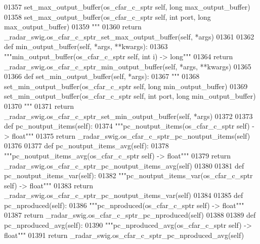 \begin{DoxyCode}
{{{{{{01357 \textcolor{stringliteral}{        set\_max\_output\_buffer(os\_cfar\_c\_sptr self, long max\_output\_buffer)}
01358 \textcolor{stringliteral}{        set\_max\_output\_buffer(os\_cfar\_c\_sptr self, int port, long max\_output\_buffer)}
01359 \textcolor{stringliteral}{        """}
01360         \textcolor{keywordflow}{return} \_radar\_swig.os\_cfar\_c\_sptr\_set\_max\_output\_buffer(self, *args)
01361 
01362     \textcolor{keyword}{def }min_output_buffer(self, *args, **kwargs):
01363         \textcolor{stringliteral}{"""min\_output\_buffer(os\_cfar\_c\_sptr self, int i) -> long"""}
01364         \textcolor{keywordflow}{return} \_radar\_swig.os\_cfar\_c\_sptr\_min\_output\_buffer(self, *args, **kwargs)
01365 
01366     \textcolor{keyword}{def }set_min_output_buffer(self, *args):
01367         \textcolor{stringliteral}{"""}
01368 \textcolor{stringliteral}{        set\_min\_output\_buffer(os\_cfar\_c\_sptr self, long min\_output\_buffer)}
01369 \textcolor{stringliteral}{        set\_min\_output\_buffer(os\_cfar\_c\_sptr self, int port, long min\_output\_buffer)}
01370 \textcolor{stringliteral}{        """}
01371         \textcolor{keywordflow}{return} \_radar\_swig.os\_cfar\_c\_sptr\_set\_min\_output\_buffer(self, *args)
01372 
01373     \textcolor{keyword}{def }pc_noutput_items(self):
01374         \textcolor{stringliteral}{"""pc\_noutput\_items(os\_cfar\_c\_sptr self) -> float"""}
01375         \textcolor{keywordflow}{return} \_radar\_swig.os\_cfar\_c\_sptr\_pc\_noutput\_items(self)
01376 
01377     \textcolor{keyword}{def }pc_noutput_items_avg(self):
01378         \textcolor{stringliteral}{"""pc\_noutput\_items\_avg(os\_cfar\_c\_sptr self) -> float"""}
01379         \textcolor{keywordflow}{return} \_radar\_swig.os\_cfar\_c\_sptr\_pc\_noutput\_items\_avg(self)
01380 
01381     \textcolor{keyword}{def }pc_noutput_items_var(self):
01382         \textcolor{stringliteral}{"""pc\_noutput\_items\_var(os\_cfar\_c\_sptr self) -> float"""}
01383         \textcolor{keywordflow}{return} \_radar\_swig.os\_cfar\_c\_sptr\_pc\_noutput\_items\_var(self)
01384 
01385     \textcolor{keyword}{def }pc_nproduced(self):
01386         \textcolor{stringliteral}{"""pc\_nproduced(os\_cfar\_c\_sptr self) -> float"""}
01387         \textcolor{keywordflow}{return} \_radar\_swig.os\_cfar\_c\_sptr\_pc\_nproduced(self)
01388 
01389     \textcolor{keyword}{def }pc_nproduced_avg(self):
01390         \textcolor{stringliteral}{"""pc\_nproduced\_avg(os\_cfar\_c\_sptr self) -> float"""}
01391         \textcolor{keywordflow}{return} \_radar\_swig.os\_cfar\_c\_sptr\_pc\_nproduced\_avg(self)
}}}}}}
\end{DoxyCode}
